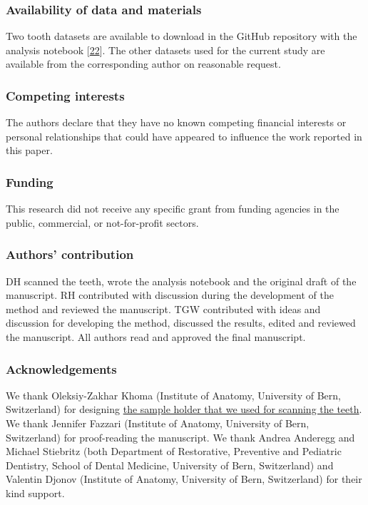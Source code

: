 \documentclass[
  american,
]{article}
\begin{document}
\hypertarget{availability-of-data-and-materials}{%
\subsubsection{Availability of data and materials}\label{availability-of-data-and-materials}}

Two tooth datasets are available to download in the GitHub repository with the analysis notebook {[}\protect\hyperlink{ref-tZRGGuMm}{22}{]}.
The other datasets used for the current study are available from the corresponding author on reasonable request.

\hypertarget{competing-interests}{%
\subsubsection{Competing interests}\label{competing-interests}}

The authors declare that they have no known competing financial interests or personal relationships that could have appeared to influence the work reported in this paper.

\hypertarget{funding}{%
\subsubsection{Funding}\label{funding}}

This research did not receive any specific grant from funding agencies in the public, commercial, or not-for-profit sectors.

\hypertarget{authors-contribution}{%
\subsubsection{Authors' contribution}\label{authors-contribution}}

DH scanned the teeth, wrote the analysis notebook and the original draft of the manuscript.
RH contributed with discussion during the development of the method and reviewed the manuscript.
TGW contributed with ideas and discussion for developing the method, discussed the results, edited and reviewed the manuscript.
All authors read and approved the final manuscript.

\hypertarget{acknowledgements}{%
\subsubsection{Acknowledgements}\label{acknowledgements}}

We thank Oleksiy-Zakhar Khoma (Institute of Anatomy, University of Bern, Switzerland) for designing \href{https://github.com/TomoGraphics/Hol3Drs/blob/master/STL/tooth_holder3.stl}{the sample holder that we used for scanning the teeth}.
We thank Jennifer Fazzari (Institute of Anatomy, University of Bern, Switzerland) for proof-reading the manuscript.
We thank Andrea Anderegg and Michael Stiebritz (both Department of Restorative, Preventive and Pediatric Dentistry, School of Dental Medicine, University of Bern, Switzerland) and Valentin Djonov (Institute of Anatomy, University of Bern, Switzerland) for their kind support.
\end{document}
